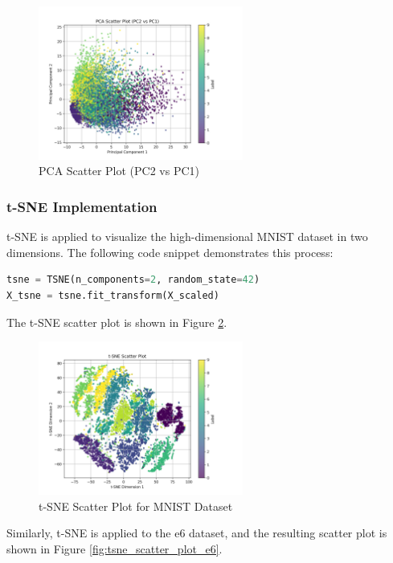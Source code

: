 \begin{figure}[H]
    \centering
    \includegraphics[width=0.6\textwidth]{Images/P3-pca_scatter_plot.png}
    \caption{PCA Scatter Plot (PC2 vs PC1)}
    \label{fig:pca_scatter_plot}
\end{figure}

\subsubsection{t-SNE Implementation}
t-SNE is applied to visualize the high-dimensional MNIST dataset in two dimensions. The following code snippet demonstrates this process:

\begin{lstlisting}[language=Python]
tsne = TSNE(n_components=2, random_state=42)
X_tsne = tsne.fit_transform(X_scaled)
\end{lstlisting}

The t-SNE scatter plot is shown in Figure \ref{fig:tsne_scatter_plot}.

\begin{figure}[H]
    \centering
    \includegraphics[width=0.6\textwidth]{Images/P3-tsne_scatter_plot.png}
    \caption{t-SNE Scatter Plot for MNIST Dataset}
    \label{fig:tsne_scatter_plot}
\end{figure}

Similarly, t-SNE is applied to the e6 dataset, and the resulting scatter plot is shown in Figure \ref{fig:tsne_scatter_plot_e6}.

